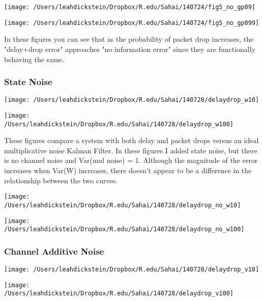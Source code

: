 \documentclass[leqno,twocolumn]{article}
\begin{document}
\begin{minipage}[c]{0.5\textwidth}
\texttt{[image: /Users/leahdickstein/Dropbox/R.edu/Sahai/140724/fig5\_no\_gp09]}
\end{minipage}
\begin{minipage}[c]{0.5\textwidth}
\texttt{[image: /Users/leahdickstein/Dropbox/R.edu/Sahai/140724/fig5\_no\_gp099]}
\end{minipage}

In these figures you can see that as the probability of packet drop increases, the "delay+drop error" approaches "no information error" since they are functionally behaving the same.

\subsubsection{State Noise}

\begin{minipage}[c]{0.5\textwidth}
\texttt{[image: /Users/leahdickstein/Dropbox/R.edu/Sahai/140728/delaydrop\_w10]}
\end{minipage}
\begin{minipage}[c]{0.5\textwidth}
\texttt{[image: /Users/leahdickstein/Dropbox/R.edu/Sahai/140728/delaydrop\_w100]}
\end{minipage}

These figures compare a system with both delay and packet drops versus an ideal multiplicative noise Kalman Filter. In these figures I added state noise, but there is no channel noise and Var(mul noise) = 1. Although the magnitude of the error increases when Var(W) increases, there doesn't appear to be a difference in the relationship between the two curves.

\begin{minipage}[c]{0.5\textwidth}
\texttt{[image: /Users/leahdickstein/Dropbox/R.edu/Sahai/140728/delaydrop\_no\_w10]}
\end{minipage}
\begin{minipage}[c]{0.5\textwidth}
\texttt{[image: /Users/leahdickstein/Dropbox/R.edu/Sahai/140728/delaydrop\_no\_w100]}
\end{minipage}

\subsubsection{Channel Additive Noise}

\begin{minipage}[c]{0.5\textwidth}
\texttt{[image: /Users/leahdickstein/Dropbox/R.edu/Sahai/140728/delaydrop\_v10]}
\end{minipage}
\begin{minipage}[c]{0.5\textwidth}
\texttt{[image: /Users/leahdickstein/Dropbox/R.edu/Sahai/140728/delaydrop\_v100]}
\end{minipage}
\end{document}
